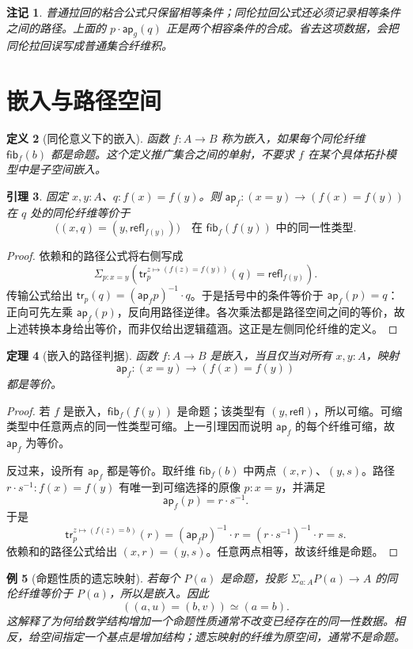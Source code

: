 \documentclass[12pt,oneside,openany,fontset=none]{ctexbook}
\theoremstyle{cn}
\newtheorem{definition}{定义}[chapter]
\newtheorem{example}[definition]{例}
\newtheorem{lemma}[definition]{引理}
\newtheorem{theorem}[definition]{定理}
\newtheorem{remark}[definition]{注记}
\numberwithin{equation}{chapter}
\newcommand{\refl}{\mathsf{refl}}
\newcommand{\ap}{\mathsf{ap}}
\newcommand{\tr}{\mathsf{tr}}
\newcommand{\fib}{\mathsf{fib}}
\begin{document}
\begin{remark}
普通拉回的粘合公式只保留相等条件；同伦拉回公式还必须记录相等条件之间的路径。上面的 $p\cdot\ap_g(q)$ 正是两个相容条件的合成。省去这项数据，会把同伦拉回误写成普通集合纤维积。
\end{remark}

\section{嵌入与路径空间}

\begin{definition}[同伦意义下的嵌入]
函数 $f:A\to B$ 称为嵌入，如果每个同伦纤维 $\fib_f(b)$ 都是命题。这个定义推广集合之间的单射，不要求 $f$ 在某个具体拓扑模型中是子空间嵌入。
\end{definition}

\begin{lemma}
固定 $x,y:A$、$q:f(x)=f(y)$。则 $\ap_f:(x=y)\to(f(x)=f(y))$ 在 $q$ 处的同伦纤维等价于
\[
 \bigl((x,q)=(y,\refl_{f(y)})\bigr)
 \quad\text{在 }\fib_f(f(y))\text{ 中的同一性类型}.
\]
\end{lemma}
\begin{proof}
依赖和的路径公式将右侧写成
\[
 \Sigma_{p:x=y}
 \left(\tr^{z\mapsto(f(z)=f(y))}_p(q)=\refl_{f(y)}\right).
\]
传输公式给出 $\tr_p(q)=(\ap_f p)^{-1}\cdot q$。于是括号中的条件等价于 $\ap_f(p)=q$：正向可先左乘 $\ap_f(p)$，反向用路径逆律。各次乘法都是路径空间之间的等价，故上述转换本身给出等价，而非仅给出逻辑蕴涵。这正是左侧同伦纤维的定义。
\end{proof}

\begin{theorem}[嵌入的路径判据]
函数 $f:A\to B$ 是嵌入，当且仅当对所有 $x,y:A$，映射
\[
 \ap_f:(x=y)\longrightarrow(f(x)=f(y))
\]
都是等价。
\end{theorem}
\begin{proof}
若 $f$ 是嵌入，$\fib_f(f(y))$ 是命题；该类型有 $(y,\refl)$，所以可缩。可缩类型中任意两点的同一性类型可缩。上一引理因而说明 $\ap_f$ 的每个纤维可缩，故 $\ap_f$ 为等价。

反过来，设所有 $\ap_f$ 都是等价。取纤维 $\fib_f(b)$ 中两点 $(x,r)$、$(y,s)$。路径 $r\cdot s^{-1}:f(x)=f(y)$ 有唯一到可缩选择的原像 $p:x=y$，并满足
\[
 \ap_f(p)=r\cdot s^{-1}.
\]
于是
\[
 \tr^{z\mapsto(f(z)=b)}_p(r)
 =(\ap_f p)^{-1}\cdot r
 =(r\cdot s^{-1})^{-1}\cdot r=s.
\]
依赖和的路径公式给出 $(x,r)=(y,s)$。任意两点相等，故该纤维是命题。
\end{proof}

\begin{example}[命题性质的遗忘映射]
若每个 $P(a)$ 是命题，投影 $\Sigma_{a:A}P(a)\to A$ 的同伦纤维等价于 $P(a)$，所以是嵌入。因此
\[
 ((a,u)=(b,v))\simeq(a=b).
\]
这解释了为何给数学结构增加一个命题性质通常不改变已经存在的同一性数据。相反，给空间指定一个基点是增加结构；遗忘映射的纤维为原空间，通常不是命题。
\end{example}
\end{document}
